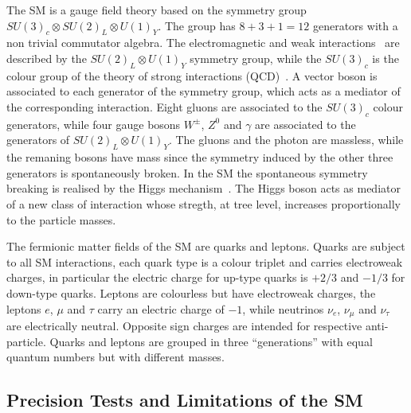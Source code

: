 The SM is a gauge field theory based on the symmetry group $SU(3)_c \otimes SU(2)_L \otimes U(1)_Y$. The group has $8+3+1=12$
generators with a non trivial commutator algebra. The electromagnetic and weak interactions~\cite{EW1,EW2,EW3}  are described  by the 
$SU(2)_L \otimes U(1)_Y$ symmetry group, while the $ SU(3)_c$ is the colour group of the theory of strong interactions (QCD)~\cite{qcd1}.
A vector boson is associated to each generator of the symmetry group, which acts as a mediator of the corresponding interaction.
Eight gluons are associated to the $ SU(3)_c$ colour generators, while  four gauge bosons $W^{\pm}$,
$Z^0$ and $\gamma$ are associated to the generators of $SU(2)_L \otimes U(1)_Y$. 
The gluons and the photon are massless, while the remaning bosons have mass  since the symmetry induced by the other three generators is
spontaneously broken. In the SM the spontaneous symmetry breaking is realised by the Higgs mechanism~\cite{ENGLERT,HIGGS,HIGGS2,HIGGS3,kibble}.
The Higgs boson acts as mediator of a new class of interaction whose stregth, at tree level, increases proportionally to the particle masses.

The fermionic matter fields of the SM are quarks and leptons. 
Quarks  are subject to all SM interactions, each quark type  is a colour triplet and carries 
electroweak charges, in particular the electric charge for up-type quarks is $+2/3$ and $-1/3$
for down-type quarks.  Leptons are colourless
but have electroweak charges, the leptons  $e$, $\mu$ and $\tau$ carry an  electric charge of $-1$,
while neutrinos $\nu_e$, $\nu_{\mu}$ and $\nu_{\tau}$ are electrically neutral. Opposite sign charges
are intended for respective anti-particle.
Quarks and leptons are grouped in three  ``generations'' with equal quantum numbers but with different masses.



\subsection{Precision Tests and Limitations of the SM}

